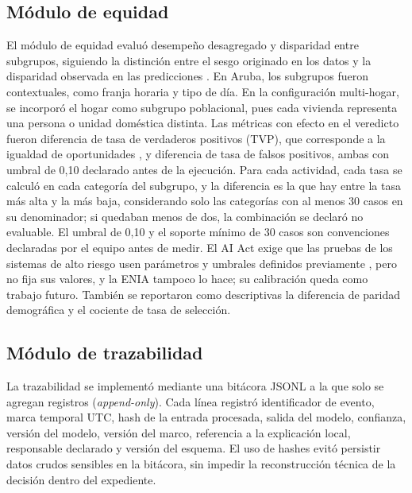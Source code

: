 \subsection{Módulo de equidad}

El módulo de equidad evaluó desempeño desagregado y disparidad entre subgrupos,
siguiendo la distinción entre el sesgo originado en los datos y la disparidad
observada en las predicciones \cite{mehrabi2021survey}.
En Aruba, los subgrupos fueron contextuales, como franja horaria y tipo de día.
En la configuración multi-hogar, se incorporó el hogar como subgrupo
poblacional, pues cada vivienda representa una persona o unidad doméstica
distinta. Las métricas con efecto en el veredicto fueron diferencia de tasa de
verdaderos positivos (TVP), que corresponde a la igualdad de oportunidades
\cite{hardt2016equality}, y diferencia de tasa de falsos positivos, ambas con
umbral de 0,10 declarado antes de la ejecución. Para cada actividad, cada tasa se
calculó en cada categoría del subgrupo, y la diferencia es la que hay entre la tasa
más alta y la más baja, considerando solo las categorías con al menos 30 casos en
su denominador; si quedaban menos de dos, la combinación se declaró no evaluable.
El umbral de 0,10 y el soporte mínimo de 30 casos son convenciones declaradas por
el equipo antes de medir. El AI Act exige que las pruebas de los sistemas de alto
riesgo usen parámetros y umbrales definidos previamente \cite[art.~9]{ue2024aiact},
pero no fija sus valores, y la ENIA tampoco lo hace; su calibración queda como
trabajo futuro.
También se reportaron como
descriptivas la diferencia de paridad demográfica y el cociente de tasa de
selección.

\subsection{Módulo de trazabilidad}

La trazabilidad se implementó mediante una bitácora JSONL a la que solo se agregan
registros (\emph{append-only}).
Cada línea registró identificador de evento, marca temporal UTC, hash de la
entrada procesada, salida del modelo, confianza, versión del modelo, versión del
marco, referencia a la explicación local, responsable declarado y versión del
esquema. El uso de hashes evitó persistir datos crudos sensibles en la
bitácora, sin impedir la reconstrucción técnica de la decisión dentro del
expediente.

